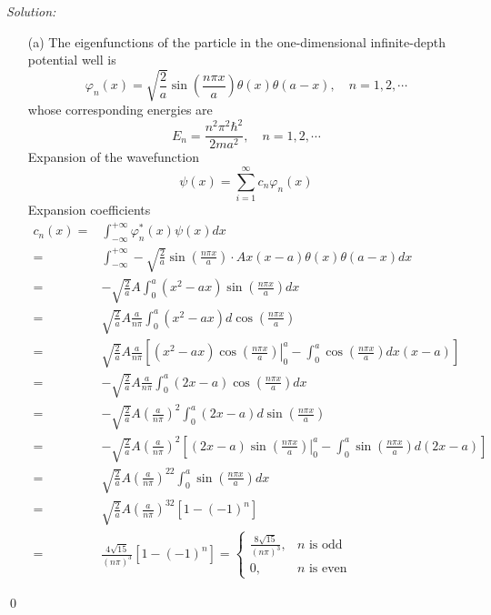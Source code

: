\documentclass[12pt,a4paper]{article}
\newenvironment{sol}
    {\emph{Solution:}
    }
    {
    \qed
    }
\begin{document}
\begin{sol}
\begin{itemize}
\item[(a)] The eigenfunctions of the particle in the one-dimensional infinite-depth potential well is
\begin{equation}
\varphi_n(x)=\sqrt{\frac{2}{a}}\sin\left(\frac{n\pi x}{a}\right)\theta(x)\theta(a-x),\quad n=1,2,\cdots
\end{equation}
whose corresponding energies are
\begin{equation}
E_n=\frac{n^2\pi^2\hbar^2}{2ma^2},\quad n=1,2,\cdots
\end{equation}
Expansion of the wavefunction
\begin{equation}
\psi(x)=\sum_{i=1}^{\infty}c_n\varphi_n(x)
\end{equation}
Expansion coefficients
\begin{align}
\nonumber c_n(x)=&\int_{-\infty}^{+\infty}\varphi_n^*(x)\psi(x)dx\\
=&\int_{-\infty}^{+\infty}-\sqrt{\frac{2}{a}}\sin\left(\frac{n\pi x}{a}\right)\cdot Ax(x-a)\theta(x)\theta(a-x)dx\\
\nonumber=&-\sqrt{\frac{2}{a}}A\int_0^a(x^2-ax)\sin\left(\frac{n\pi x}{a}\right)dx\\
\nonumber=&\sqrt{\frac{2}{a}}A\frac{a}{n\pi}\int_0^a(x^2-ax)d\cos\left(\frac{n\pi x}{a}\right)\\
\nonumber=&\sqrt{\frac{2}{a}}A\frac{a}{n\pi}\left[\left.(x^2-ax)\cos\left(\frac{n\pi x}{a}\right)\right|_0^a-\int_0^a\cos\left(\frac{n\pi x}{a}\right)dx(x-a)\right]\\
\nonumber=&-\sqrt{\frac{2}{a}}A\frac{a}{n\pi}\int_0^a(2x-a)\cos\left(\frac{n\pi x}{a}\right)dx\\
\nonumber=&-\sqrt{\frac{2}{a}}A\left(\frac{a}{n\pi}\right)^2\int_0^a(2x-a)d\sin\left(\frac{n\pi x}{a}\right)\\
\nonumber=&-\sqrt{\frac{2}{a}}A\left(\frac{a}{n\pi}\right)^2\left[\left.(2x-a)\sin\left(\frac{n\pi x}{a}\right)\right|_0^a-\int_0^a\sin\left(\frac{n\pi x}{a}\right)d(2x-a)\right]\\
\nonumber=&\sqrt{\frac{2}{a}}A\left(\frac{a}{n\pi}\right)^22\int_0^a\sin\left(\frac{n\pi x}{a}\right)dx\\
\nonumber=&\sqrt{\frac{2}{a}}A\left(\frac{a}{n\pi}\right)^32[1-(-1)^n]\\
=&\frac{4\sqrt{15}}{(n\pi)^3}[1-(-1)^n]=\left\{\begin{array}{ll}\frac{8\sqrt{15}}{(n\pi)^3},&n\text{ is odd}\\0,&n\text{ is even}\end{array}\right.

\end{align}
\end{itemize}
\end{sol}
\end{document}

